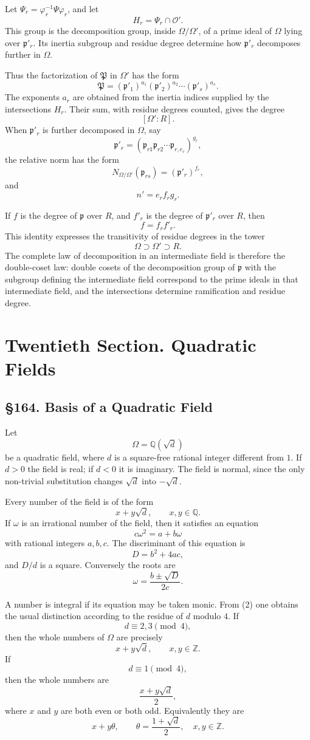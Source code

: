 \documentclass[11pt,a4paper]{book}
\newcommand{\webersection}[2]{\clearpage\section*{\S #1. #2}}
\newcommand{\booktitle}[1]{\clearpage\chapter*{#1}}
\newcommand{\Pgr}{\mathfrak P}
\newcommand{\p}{\mathfrak p}
\begin{document}
Let \(\Psi_r=\varphi_r^{-1}\Psi\varphi_r\), and let
\[
  H_r=\Psi_r\cap\mathcal O'.
\]
This group is the decomposition group, inside \(\Omega/\Omega'\), of a prime ideal of \(\Omega\) lying over \(\p'_r\).  Its inertia subgroup and residue degree determine how \(\p'_r\) decomposes further in \(\Omega\).

Thus the factorization of \(\Pgr\) in \(\Omega'\) has the form
\[
  \Pgr=(\p'_1)^{a_1}(\p'_2)^{a_2}\cdots(\p'_s)^{a_s}.
\tag{2}
\]
The exponents \(a_r\) are obtained from the inertia indices supplied by the intersections \(H_r\).  Their sum, with residue degrees counted, gives the degree
\[
  [\Omega':R].
\]
When \(\p'_r\) is further decomposed in \(\Omega\), say
\[
  \p'_r=(\p_{r1}\p_{r2}\cdots\p_{r,e_r})^{g_r},
\tag{3}
\]
the relative norm has the form
\[
  N_{\Omega/\Omega'}(\p_{rs})=(\p'_r)^{f_r},
\tag{4}
\]
and
\[
  n'=e_r f_r g_r.
\tag{5}
\]

If \(f\) is the degree of \(\p\) over \(R\), and \(f'_r\) is the degree of \(\p'_r\) over \(R\), then
\[
  f=f_r f'_r.
\tag{6}
\]
This identity expresses the transitivity of residue degrees in the tower
\[
  \Omega\supset\Omega'\supset R.
\]
The complete law of decomposition in an intermediate field is therefore the double-coset law: double cosets of the decomposition group of \(\p\) with the subgroup defining the intermediate field correspond to the prime ideals in that intermediate field, and the intersections determine ramification and residue degree.

\booktitle{Twentieth Section. Quadratic Fields}

\webersection{164}{Basis of a Quadratic Field}

Let
\[
  \Omega=\mathbb Q(\sqrt d)
\]
be a quadratic field, where \(d\) is a square-free rational integer different from \(1\).  If \(d>0\) the field is real; if \(d<0\) it is imaginary.  The field is normal, since the only non-trivial substitution changes \(\sqrt d\) into \(-\sqrt d\).

Every number of the field is of the form
\[
  x+y\sqrt d,\qquad x,y\in\mathbb Q.
\]
If \(\omega\) is an irrational number of the field, then it satisfies an equation
\[
  c\omega^2=a+b\omega
\tag{1}
\]
with rational integers \(a,b,c\).  The discriminant of this equation is
\[
  D=b^2+4ac,
\]
and \(D/d\) is a square.  Conversely the roots are
\[
  \omega=\frac{b\pm\sqrt D}{2c}.
\tag{2}
\]

A number is integral if its equation may be taken monic.  From (2) one obtains the usual distinction according to the residue of \(d\) modulo \(4\).  If
\[
  d\equiv2,3\pmod4,
\]
then the whole numbers of \(\Omega\) are precisely
\[
  x+y\sqrt d,\qquad x,y\in\mathbb Z.
\tag{3}
\]
If
\[
  d\equiv1\pmod4,
\]
then the whole numbers are
\[
  \frac{x+y\sqrt d}{2},
\]
where \(x\) and \(y\) are both even or both odd.  Equivalently they are
\[
  x+y\theta,\qquad \theta=\frac{1+\sqrt d}{2},\quad x,y\in\mathbb Z.
\tag{4}
\]
\end{document}
